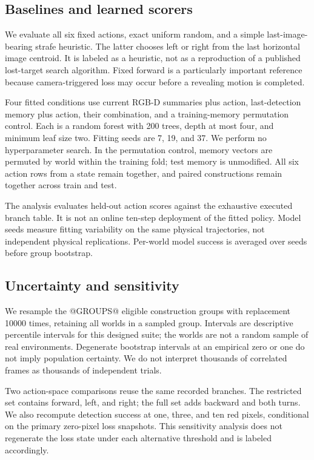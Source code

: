 \documentclass[10pt,twocolumn,a4paper]{article}
\begin{document}
\subsection{Baselines and learned scorers}
We evaluate all six fixed actions, exact uniform random, and a simple last-image-bearing strafe heuristic. The latter chooses left or right from the last horizontal image centroid. It is labeled as a heuristic, not as a reproduction of a published lost-target search algorithm. Fixed forward is a particularly important reference because camera-triggered loss may occur before a revealing motion is completed.

Four fitted conditions use current RGB-D summaries plus action, last-detection memory plus action, their combination, and a training-memory permutation control. Each is a random forest with 200 trees, depth at most four, and minimum leaf size two. Fitting seeds are 7, 19, and 37. We perform no hyperparameter search. In the permutation control, memory vectors are permuted by world within the training fold; test memory is unmodified. All six action rows from a state remain together, and paired constructions remain together across train and test.

The analysis evaluates held-out action scores against the exhaustive executed branch table. It is not an online ten-step deployment of the fitted policy. Model seeds measure fitting variability on the same physical trajectories, not independent physical replications. Per-world model success is averaged over seeds before group bootstrap.

\subsection{Uncertainty and sensitivity}
We resample the @GROUPS@ eligible construction groups with replacement 10000 times, retaining all worlds in a sampled group. Intervals are descriptive percentile intervals for this designed suite; the worlds are not a random sample of real environments. Degenerate bootstrap intervals at an empirical zero or one do not imply population certainty. We do not interpret thousands of correlated frames as thousands of independent trials.

Two action-space comparisons reuse the same recorded branches. The restricted set contains forward, left, and right; the full set adds backward and both turns. We also recompute detection success at one, three, and ten red pixels, conditional on the primary zero-pixel loss snapshots. This sensitivity analysis does not regenerate the loss state under each alternative threshold and is labeled accordingly.
\end{document}
